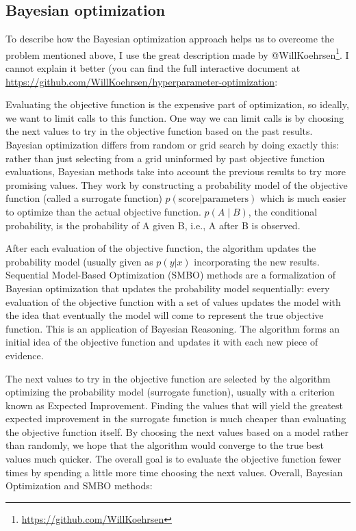 \begin{subappendices}
\subsection{Bayesian optimization}

To describe how the Bayesian optimization approach helps us to overcome the problem mentioned above, I use the great description made by @WillKoehrsen\footnote{\url{https://github.com/WillKoehrsen}}. I cannot explain it better (you can find the full interactive document at\\ \url{https://github.com/WillKoehrsen/hyperparameter-optimization}:

\begin{itshape}
Evaluating the objective function is the expensive part of optimization, so ideally, we want to limit calls to this function. One way we can limit calls is by choosing the next values to try in the objective function based on the past results. Bayesian optimization differs from random or grid search by doing exactly this: rather than just selecting from a grid uninformed by past objective function evaluations, Bayesian methods take into account the previous results to try more promising values. They work by constructing a probability model of the objective function (called a surrogate function) $p(\text{score} | \text{parameters})$ which is much easier to optimize than the actual objective function. $p (A\mid B)$, the conditional probability, is the probability of A given B, i.e., A after B is observed.


After each evaluation of the objective function, the algorithm updates the probability model (usually given as $p(y | x)$ incorporating the new results. Sequential Model-Based Optimization (\gls{SMBO}) methods are a formalization of Bayesian optimization that updates the probability model sequentially: every evaluation of the objective function with a set of values updates the model with the idea that eventually the model will come to represent the true objective function. This is an application of Bayesian Reasoning. The algorithm forms an initial idea of the objective function and updates it with each new piece of evidence.

The next values to try in the objective function are selected by the algorithm optimizing the probability model (surrogate function), usually with a criterion known as Expected Improvement. Finding the values that will yield the greatest expected improvement in the surrogate function is much cheaper than evaluating the objective function itself. By choosing the next values based on a model rather than randomly, we hope that the algorithm would converge to the true best values much quicker. The overall goal is to evaluate the objective function fewer times by spending a little more time choosing the next values. Overall, Bayesian Optimization and \gls{SMBO} methods:


\end{itshape}
\end{subappendices}
